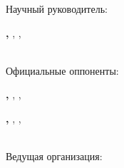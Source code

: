 \par\bigskip
\noindent%
Научный руководитель:\par                                \hspace{0.01\paperheight}\begin{minipage}{0.85\textwidth}
	\textbf{\supervisorFio,} \supervisorRegalia, \supervisorJobPlace, \supervisorJobPost
	\end{minipage}
\vspace{0.013\paperheight}\\
Официальные оппоненты:  \par
\hspace{0.01\paperheight}\begin{minipage}{0.85\textwidth}
	\textbf{\opponentOneFio,}
	\opponentOneRegalia, \opponentOneJobPlace, \opponentOneJobPost \par
	\vspace{0.01\paperheight}
	\textbf{\opponentTwoFio,}
	\opponentTwoRegalia, \opponentTwoJobPlace, \opponentTwoJobPost
	\end{minipage}
\vspace{0.013\paperheight} \\
Ведущая организация: \par
\hspace{0.01\paperheight}\begin{minipage}{0.85\textwidth}   			\leadingOrganizationTitle
\end{minipage}
\par\bigskip


